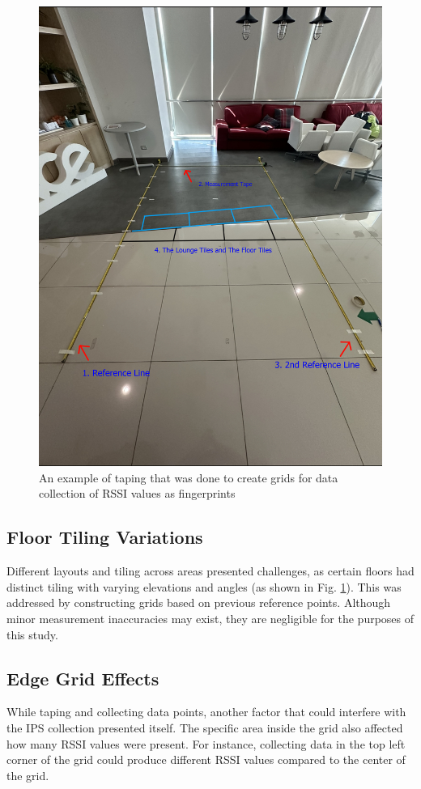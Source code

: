 \documentclass[runningheads]{llncs}
\begin{document}
\begin{figure}[!tbph]
	\centering
	\includegraphics[width=\textwidth]{figures/meth2.jpg}
	\caption{An example of taping that was done to create grids for data collection of RSSI values as fingerprints}
	\label{fig:taping}
\end{figure}

\subsection{Floor Tiling Variations}
Different layouts and tiling across areas presented challenges, as certain floors had distinct tiling with varying elevations and angles (as shown in Fig. \ref{fig:taping}). This was addressed by constructing grids based on previous reference points. Although minor measurement inaccuracies may exist, they are negligible for the purposes of this study.

\subsection{Edge Grid Effects}
While taping and collecting data points, another factor that could interfere with the IPS collection presented itself. The specific area inside the grid also affected how many RSSI values were present. For instance, collecting data in the top left corner of the grid could produce different RSSI values compared to the center of the grid. 
\end{document}
